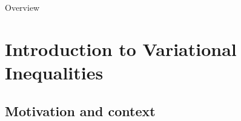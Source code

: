\documentclass[aspectratio=169,xcolor=dvipsnames,11pt]{beamer}
\begin{document}
\begin{frame}{Overview}
\tableofcontents
\end{frame}

\section{Introduction to Variational Inequalities}
\subsection{Motivation and context}\label{sec:motivation}
\end{document}
